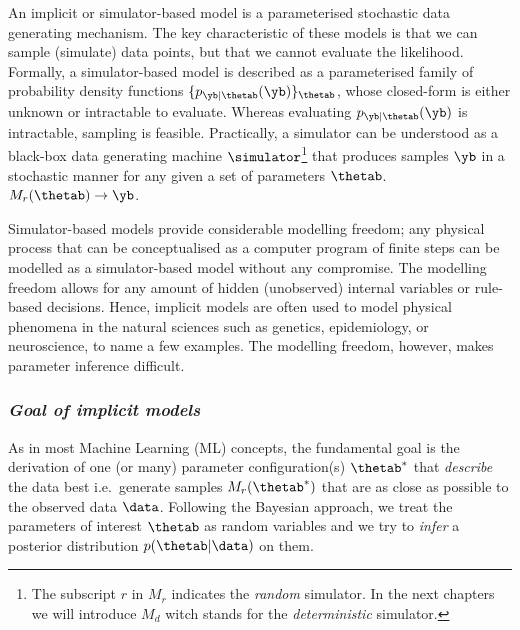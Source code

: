 
An implicit or simulator-based model is a parameterised stochastic
data generating mechanism. The key characteristic of these models is
that we can sample (simulate) data points, but that we cannot evaluate
the likelihood. Formally, a simulator-based model is described as a
parameterised family of probability density functions $\{
p_{\yb|\thetab}(\yb) \}_{\thetab}$, whose closed-form is either
unknown or intractable to evaluate. Whereas evaluating
$p_{\yb|\thetab}(\yb)$ is intractable, sampling is
feasible. Practically, a simulator can be understood as a black-box
data generating machine $\simulator$\footnote{The subscript $r$ in $M_r$
indicates the \textit{random} simulator. In the next chapters we will
introduce $M_d$ witch stands for the \textit{deterministic}
simulator.} that produces samples $\yb$ in a stochastic manner for any
given a set of parameters $\thetab$.%
$M_r(\thetab) \rightarrow \yb$.

Simulator-based models provide considerable modelling freedom; any physical process that can be
conceptualised as a computer program of finite steps can be modelled
as a simulator-based model without any compromise. The modelling
freedom allows for any amount of hidden (unobserved) internal variables
or rule-based decisions. Hence, implicit models are often used to
model physical phenomena in the natural sciences such as genetics, epidemiology, or neuroscience, to name a few examples.
The modelling freedom, however, makes parameter inference difficult.


\subsubsection*{\textit{Goal of implicit models}}

As in most Machine Learning (ML) concepts, the fundamental goal is the
derivation of one (or many) parameter configuration(s) $\thetab^*$
that \textit{describe} the data best i.e.\ generate samples
$M_r(\thetab^*)$ that are as close as possible to the observed data
$\data$. Following the Bayesian approach, we treat the
parameters of interest $\thetab$ as random variables and we try to
\textit{infer} a posterior distribution $p(\thetab|\data)$ on them.
